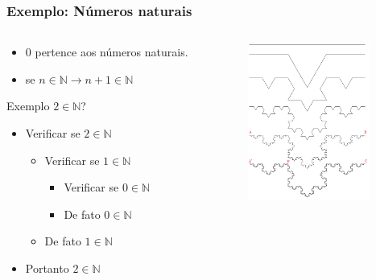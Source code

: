\documentclass[10pt]{beamer}
\begin{document}
\begin{frame}
  \frametitle{Exemplo: Números naturais}
  \begin{columns}[t]
    \begin{column}{6cm}
      \begin{itemize}
        \item $0$ pertence aos números naturais.
        \item se $n \in \mathds{N} \rightarrow n+1 \in \mathds{N}$
      \end{itemize}
      \vfill
      Exemplo $2 \in \mathds{N}$?
      \begin{itemize}
        \item <1- | alert@1>Verificar se $2 \in \mathds{N}$
              \begin{itemize}
                \item <2- | alert@2>Verificar se $1 \in \mathds{N}$
                      \begin{itemize}
                        \item<3- | alert@3> Verificar se $0 \in \mathds{N}$
                        \item<4- | alert@4> De fato $0 \in \mathds{N}$
                      \end{itemize}
                \item <5- | alert@5>De fato $1 \in \mathds{N}$
              \end{itemize}
        \item<6- | alert@6> Portanto $2 \in \mathds{N}$
      \end{itemize}
    \end{column}
    \begin{column}{6cm}
      \begin{figure}[h]
        \begin{center}
          \includegraphics[width=4cm]{fig/img02.png}
        \end{center}
      \end{figure}
    \end{column}
  \end{columns}
\end{frame}
\end{document}
